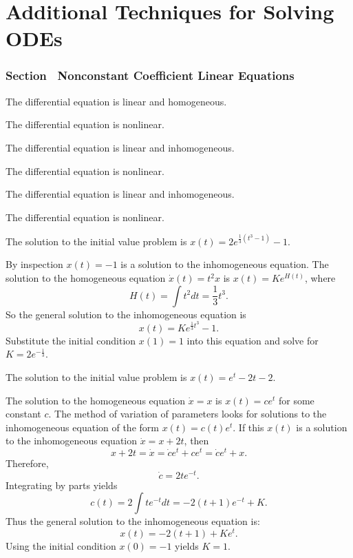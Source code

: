 \chapter{Additional Techniques for Solving ODEs}

\subsection*{Section~\protect{\ref{sec:VarConstS}} Nonconstant Coefficient
Linear Equations}

 The differential equation is linear and homogeneous.

 The differential equation is nonlinear.

 The differential equation is linear and inhomogeneous.

 The differential equation is nonlinear.

 The differential equation is linear and inhomogeneous.

 The differential equation is nonlinear.

 \ans The solution to the initial value problem is
$x(t) = 2e^{\frac{1}{3}(t^3 - 1)} - 1$.

\soln By inspection $x(t) = -1$ is a solution to the inhomogeneous
equation.  The solution to the homogeneous equation $\dot{x}(t) = t^2x$ is
$x(t) = Ke^{H(t)}$, where
\[
H(t) = \int t^2dt = \frac{1}{3}t^3.
\]
So the general solution to the inhomogeneous equation is
\[
x(t) = Ke^{\frac{1}{3}t^3} - 1.
\]
Substitute the initial condition $x(1) = 1$ into this equation and
solve for $K = 2e^{-\frac{1}{3}}$.

\newpage
{} \ans The solution to the initial value problem is
$x(t) = e^t - 2t - 2$.

\soln The solution to the homogeneous equation $\dot{x}=x$ is $x(t)=ce^t$
for some constant $c$.  The method of variation of parameters looks for 
solutions to the inhomogeneous equation of the form $x(t)=c(t)e^t$.  If this 
$x(t)$ is a solution to the inhomogeneous equation $\dot{x}=x+2t$, then
\[
x+2t=\dot{x}=\dot{c}e^t+ce^t = \dot{c}e^t+x.
\]
Therefore,
\[
\dot{c} = 2te^{-t}.
\]
Integrating by parts yields
\[
c(t) = 2\int te^{-t}dt = -2(t+1)e^{-t} + K.
\]
Thus the general solution to the inhomogeneous equation is:
\[
x(t) = -2(t+1) + Ke^t.
\]
Using the initial condition $x(0)=-1$ yields $K=1$. 

